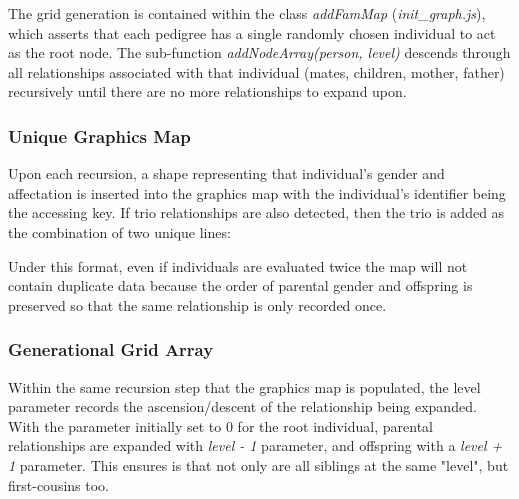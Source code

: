The grid generation is contained within the class \textit{addFamMap} (\textit{init\_graph.js}), which asserts that each pedigree has a single randomly chosen individual to act as the root node. The sub-function \textit{addNodeArray(person, level)} descends through all relationships associated with that individual (mates, children, mother, father) recursively until there are no more relationships to expand upon.

\subsubsection{Unique Graphics Map}
Upon each recursion, a shape representing that individual’s gender and affectation is inserted into the graphics map with the individual’s identifier being the accessing key. If trio relationships are also detected, then the trio is added as the combination of two unique lines:
\begin{description}

\end{description}

Under this format, even if individuals are evaluated twice the map will not contain duplicate data because the order of parental gender and offspring is preserved so that the same relationship is only recorded once.

\subsubsection{Generational Grid Array}

Within the same recursion step that the graphics map is populated, the level parameter records the ascension/descent of the relationship being expanded.  With the parameter initially set to 0 for the root individual, parental relationships are expanded with \textit{level - 1} parameter, and offspring with a \textit{level + 1} parameter. This ensures is that not only are all siblings at the same "level", but first-cousins too.

